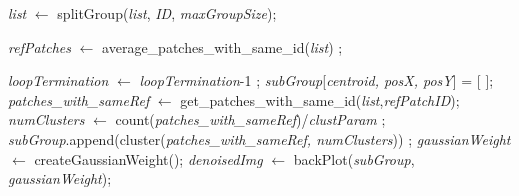 \documentclass[fleqn,10pt]{wlscirep}
\begin{document}
\begin{algorithm}
\begin{algorithmic}[1]
				
				\State \textit{list} $\gets$ splitGroup(\textit{list}, \textit{ID}, \textit{maxGroupSize});
				
				
				\EndIf
				
				\EndFor
				
				\State \textit{refPatches} $\gets$ average\_patches\_with\_same\_id(\textit{list}) ;
				
				\State \textit{loopTermination} $\gets$ \textit{loopTermination}-1 ;
				\EndFor
				\State \textit{subGroup}[\textit{centroid, posX, posY}] = [ ];
				\State \textit{patches\_with\_sameRef} $\gets$ get\_patches\_with\_same\_id(\textit{list},\textit{refPatchID});
				\State \textit{numClusters} $\gets$ count(\textit{patches\_with\_sameRef})/\textit{clustParam} ;
				\State \textit{subGroup}.append(cluster(\textit{patches\_with\_sameRef, numClusters})) ;
				\EndFor
				\State \textit{gaussianWeight} $\gets$ createGaussianWeight();
				\State \textit{denoisedImg} $\gets$ backPlot(\textit{subGroup}, \textit{gaussianWeight});
			\end{algorithmic}
		\end{algorithm}
		
		
		
			

		
	
\end{document}
